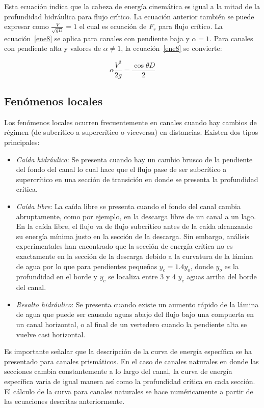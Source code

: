 \documentclass[11pt, oneside]{article}
\begin{document}
Esta ecuaci\'on indica que la cabeza de energ\'ia cinem\'atica es igual a la mitad de la profundidad hidr\'aulica para flujo cr\'itico. La ecuaci\'on anterior tambi\'en se puede expresar como $\frac{V}{\sqrt{gD}}=1$ el cual es ecuaci\'on de $F_r$ para flujo cr\'itico. La ecuaci\'on~\ref{ene8} se aplica para canales con pendiente baja y $\alpha = 1$. Para canales con pendiente alta y valores de $\alpha \ne 1$, la ecuaci\'on~\ref{ene8} se convierte:

\begin{equation}
\alpha \frac{V^2}{2g} = \frac{\cos \theta D}{2} 
\label{ene9}
\end{equation}

\subsection{Fen\'omenos locales}
Los fen\'omenos locales ocurren frecuentemente en canales cuando hay cambios de r\'egimen (de subcr\'itico a supercr\'itico o viceversa) en distancias. Existen dos tipos principales:
\begin{itemize}
\item \emph{Ca\'ida hidr\'aulica}: Se presenta cuando hay un cambio brusco de la pendiente del fondo del canal lo cual hace que el flujo pase de ser subcr\'itico a supercr\'itico en una secci\'on de transici\'on en donde se presenta  la profundidad cr\'itica. 
\item \emph{Ca\'ida libre}: La ca\'ida libre se presenta cuando el fondo del canal cambia abruptamente, como por ejemplo, en la descarga libre de un canal a un lago. En la ca\'ida libre, el flujo va de flujo subcr\'itico antes de la ca\'ida alcanzando su energ\'ia m\'inima justo en la secci\'on de la descarga. Sin embargo, an\'alisis experimentales han encontrado que la secci\'on de energ\'ia cr\'itica no es exactamente en la secci\'on de la descarga debido a la curvatura de la l\'amina de agua por lo que para pendientes pequeñas $y_c = 1.4 y_o$, donde $y_o$ es la profundidad en el borde y $y_c$ se localiza entre 3 y 4 $y_c$ aguas arriba del borde del canal.
\item \emph{Resalto hidr\'aulico}: Se presenta cuando existe un aumento r\'apido de la l\'amina de agua que puede ser causado aguas abajo del flujo bajo una compuerta  en un canal horizontal, o al final de un vertedero cuando la pendiente alta se vuelve casi horizontal. 
\end{itemize}
Es importante señalar que la descripci\'on de la curva de energ\'ia espec\'ifica se ha presentado para canales prism\'aticos. En el caso de canales naturales en donde las secciones cambia constantemente a lo largo del canal, la curva de energ\'ia espec\'ifica varia de igual manera as\'i como la profundidad cr\'itica en cada secci\'on. El c\'alculo de la curva para canales naturales se hace num\'ericamente a partir de las ecuaciones descritas anteriormente. 
\end{document}

